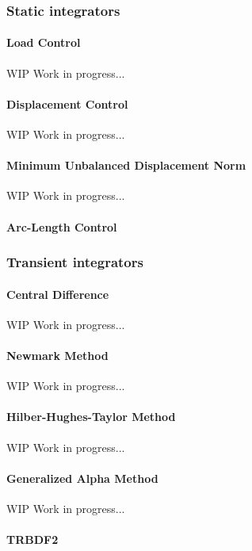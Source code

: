 \subsubsection{Static integrators}

\paragraph{Load Control}
WIP Work in progress...

\paragraph{Displacement Control}
WIP Work in progress...

\paragraph{Minimum Unbalanced Displacement Norm}
WIP Work in progress...

\paragraph{Arc-Length Control}
    
\subsubsection{Transient integrators}

\paragraph{Central Difference}
WIP Work in progress...

\paragraph{Newmark Method}
WIP Work in progress...

\paragraph{Hilber-Hughes-Taylor Method}
WIP Work in progress...

\paragraph{Generalized Alpha Method}
WIP Work in progress...

\paragraph{TRBDF2}
    
